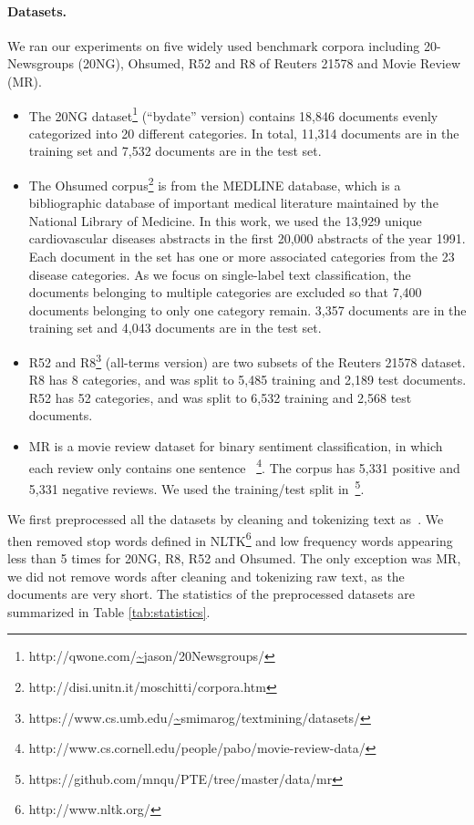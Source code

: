 \documentclass[letterpaper]{article} \usepackage{aaai19}  \usepackage{times}  \usepackage{helvet}  \usepackage{courier}  \usepackage{url}  \usepackage{graphicx}  \frenchspacing  \usepackage{amsmath}
\begin{document}
\paragraph{Datasets.}
We ran our experiments on five widely used benchmark corpora including 20-Newsgroups (20NG),  Ohsumed, R52 and R8 of Reuters 21578 and Movie Review (MR). 
\begin{itemize}
\item The 20NG dataset\footnote{http://qwone.com/\url{~}jason/20Newsgroups/} (“bydate” version) contains 18,846 documents evenly categorized into 20 different categories. In total, 11,314 documents are in the training set and 7,532 documents are in the test set.
\item The Ohsumed corpus\footnote{http://disi.unitn.it/moschitti/corpora.htm} is from the MEDLINE database, which is a bibliographic database of important medical literature maintained by the National Library of Medicine. In this work, we used the 13,929 unique cardiovascular diseases abstracts in the first 20,000 abstracts of the year 1991.  Each document in the set has one or more associated categories from the 23 disease categories. As we focus on single-label text classification, the documents belonging to multiple categories are excluded so that 7,400 documents belonging to only one category remain. 3,357 documents are in the training set and 4,043 documents are in the test set. 
\item R52 and R8\footnote{https://www.cs.umb.edu/\url{~}smimarog/textmining/datasets/} (all-terms version) are two subsets of the Reuters 21578 dataset. R8 has 8 categories, and was split to 5,485 training and 2,189 test documents. R52 has 52 categories, and was split to 6,532 training and 2,568 test documents. 
\item MR is a movie review dataset for binary sentiment classification, in which each review only contains one sentence ~\cite{pang2005seeing}\footnote{http://www.cs.cornell.edu/people/pabo/movie-review-data/}. The corpus has 5,331 positive and 5,331 negative reviews. We used the training/test split in~\cite{tang2015pte}\footnote{https://github.com/mnqu/PTE/tree/master/data/mr}.
\end{itemize}
We first preprocessed all the datasets by cleaning and tokenizing text as~\cite{kim2014convolutional}. We then removed stop words defined in NLTK\footnote{http://www.nltk.org/} and low frequency words appearing less than 5 times for 20NG, R8, R52 and Ohsumed. The only exception was MR, we did not remove words after cleaning and tokenizing raw text, as the documents are very short. The statistics of the preprocessed datasets are summarized in Table \ref{tab:statistics}.
\end{document}
